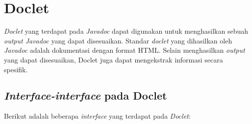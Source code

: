 \section{Doclet}
\label{sec:doclet}
{\it Doclet} yang terdapat pada {\it Javadoc} dapat digunakan untuk menghasilkan sebuah {\it output Javadoc} yang dapat disesuaikan. Standar {\it doclet} yang dihasilkan oleh {\it Javadoc} adalah dokumentasi dengan format HTML. Selain menghasilkan {\it output} yang dapat disesuaikan, Doclet juga dapat mengekstrak informasi secara spesifik.~\cite{doclet:02:doclet}

\subsection{\textit{Interface-interface} pada Doclet}
\label{sec:interface-doclet}
Berikut adalah beberapa {\it interface} yang terdapat pada {\it Doclet}:
